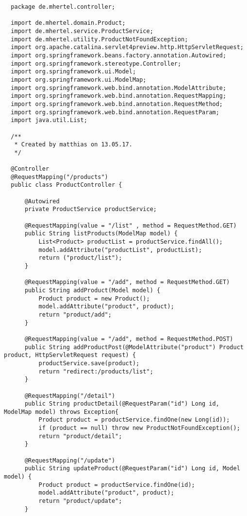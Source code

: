 \documentclass[12pt]{article}
\begin{document}
\begin{lstlisting}
  package de.mhertel.controller;

  import de.mhertel.domain.Product;
  import de.mhertel.service.ProductService;
  import de.mhertel.utility.ProductNotFoundException;
  import org.apache.catalina.servlet4preview.http.HttpServletRequest;
  import org.springframework.beans.factory.annotation.Autowired;
  import org.springframework.stereotype.Controller;
  import org.springframework.ui.Model;
  import org.springframework.ui.ModelMap;
  import org.springframework.web.bind.annotation.ModelAttribute;
  import org.springframework.web.bind.annotation.RequestMapping;
  import org.springframework.web.bind.annotation.RequestMethod;
  import org.springframework.web.bind.annotation.RequestParam;
  import java.util.List;

  /**
   * Created by matthias on 13.05.17.
   */

  @Controller
  @RequestMapping("/products")
  public class ProductController {

      @Autowired
      private ProductService productService;

      @RequestMapping(value = "/list" , method = RequestMethod.GET)
      public String listProducts(ModelMap model) {
          List<Product> productList = productService.findAll();
          model.addAttribute("productList", productList);
          return ("product/list");
      }

      @RequestMapping(value = "/add", method = RequestMethod.GET)
      public String addProduct(Model model) {
          Product product = new Product();
          model.addAttribute("product", product);
          return "product/add";
      }

      @RequestMapping(value = "/add", method = RequestMethod.POST)
      public String addProductPost(@ModelAttribute("product") Product product, HttpServletRequest request) {
          productService.save(product);
          return "redirect:/products/list";
      }

      @RequestMapping("/detail")
      public String productDetail(@RequestParam("id") Long id, ModelMap model) throws Exception{
          Product product = productService.findOne(new Long(id));
          if (product == null) throw new ProductNotFoundException();
          return "product/detail";
      }

      @RequestMapping("/update")
      public String updateProduct(@RequestParam("id") Long id, Model model) {
          Product product = productService.findOne(id);
          model.addAttribute("product", product);
          return "product/update";
      }


\end{lstlisting}
\end{document}
